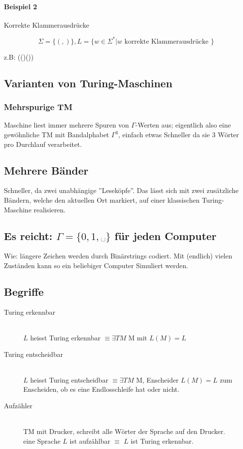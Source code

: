 \paragraph{Beispiel 2} Korrekte Klammerausdrücke

\[
	\Sigma = \{(,)\}, L = \{w \in \Sigma^\ast | w \text{ korrekte Klammerausdrücke } \}
\]

z.B: (()())


\subsection{Varianten von Turing-Maschinen}

\subsubsection{Mehrspurige TM}

Maschine liest immer mehrere Spuren von $\Gamma$-Werten aus; eigentlich also eine gewöhnliche TM mit Bandalphabet $\Gamma^3$, einfach etwas Schneller da sie 3 Wörter pro Durchlauf verarbeitet.

\subsection{Mehrere Bänder}

Schneller, da zwei unabhängige ''Leseköpfe''. Das lässt sich mit zwei zusätzliche Bändern, welche den aktuellen Ort markiert, auf einer klassischen Turing-Maschine realisieren.

\subsection{Es reicht: $\Gamma = \{ 0, 1, \text{␣}\}$ für jeden Computer}

Wie: längere Zeichen werden durch Binärstrings codiert. Mit (endlich) vielen Zuständen kann so ein beliebiger Computer Simuliert werden.


\subsection{Begriffe}

\begin{description}
	\item[Turing erkennbar] \hfill \\
		$L$ heisst Turing erkennbar $\equiv \exists TM$ M mit $L(M)=L$
	\item[Turing entscheidbar] \hfill \\
		$L$ heisst Turing entscheidbar $\equiv \exists TM$ M, Enscheider $L(M)=L$ zum Enscheiden, ob es eine Endlosschleife hat oder nicht.
	\item[Aufzähler] \hfill \\
		TM mit Drucker, schreibt alle Wörter der Sprache auf den Drucker. \\
		eine Sprache $L$ ist aufzählbar $\equiv$ $L$ ist Turing erkennbar.
\end{description}


